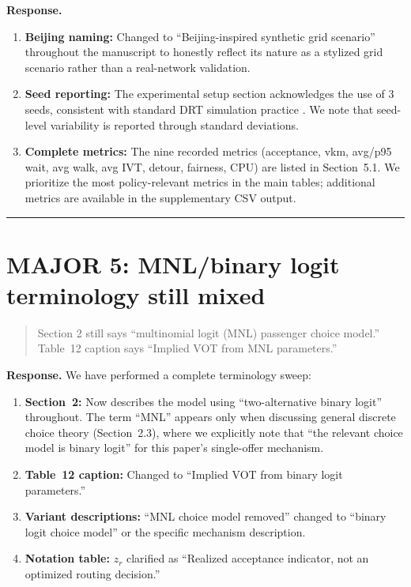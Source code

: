 \documentclass[12pt]{article}
\newenvironment{revcomment}{%
  \begin{quote}\itshape
}{%
  \end{quote}
}
\begin{document}
\textbf{Response.}

\begin{enumerate}
  \item \textbf{Beijing naming:} Changed to ``Beijing-inspired synthetic grid scenario'' throughout the manuscript to honestly reflect its nature as a stylized grid scenario rather than a real-network validation.

  \item \textbf{Seed reporting:} The experimental setup section acknowledges the use of 3 seeds, consistent with standard DRT simulation practice \citep{wu2025}. We note that seed-level variability is reported through standard deviations.

  \item \textbf{Complete metrics:} The nine recorded metrics (acceptance, vkm, avg/p95 wait, avg walk, avg IVT, detour, fairness, CPU) are listed in Section~5.1. We prioritize the most policy-relevant metrics in the main tables; additional metrics are available in the supplementary CSV output.
\end{enumerate}

\bigskip\hrule\bigskip

\section*{MAJOR 5: MNL/binary logit terminology still mixed}

\begin{revcomment}
Section 2 still says ``multinomial logit (MNL) passenger choice model.'' Table~12 caption says ``Implied VOT from MNL parameters.''
\end{revcomment}

\textbf{Response.} We have performed a complete terminology sweep:

\begin{enumerate}
  \item \textbf{Section~2:} Now describes the model using ``two-alternative binary logit'' throughout. The term ``MNL'' appears only when discussing general discrete choice theory (Section~2.3), where we explicitly note that ``the relevant choice model is binary logit'' for this paper's single-offer mechanism.

  \item \textbf{Table~12 caption:} Changed to ``Implied VOT from binary logit parameters.''

  \item \textbf{Variant descriptions:} ``MNL choice model removed'' changed to ``binary logit choice model'' or the specific mechanism description.

  \item \textbf{Notation table:} $z_r$ clarified as ``Realized acceptance indicator, not an optimized routing decision.''
\end{enumerate}
\end{document}
